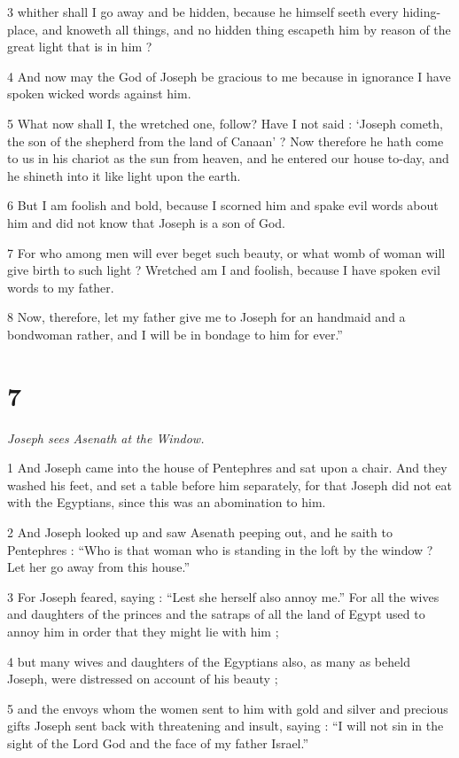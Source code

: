 3 whither shall I go away and be hidden, because he himself seeth every hiding-place, and knoweth all things, and no hidden thing escapeth him by reason of the great light that is in him ? 

4 And now may the God of Joseph be gracious to me because in ignorance I have spoken wicked words against him. 

5 What now shall I, the wretched one, follow? Have I not said : ‘Joseph cometh, the son of the shepherd from the land of Canaan’ ? Now therefore he hath come to us in his chariot as the sun from heaven, and he entered our house to-day, and he shineth into it like light upon the earth. 

6 But I am foolish and bold, because I scorned him and spake evil words about him and did not know that Joseph is a son of God. 

7 For who among men will ever beget such beauty, or what womb of woman will give birth to such light ? Wretched am I and foolish, because I have spoken evil words to my father. 

8 Now, therefore, let my father give me to Joseph for an handmaid and a bondwoman rather, and I will be in bondage to him for ever.”

\chapter{7}

\par \textit{Joseph sees Asenath at the Window.}

1 And Joseph came into the house of Pentephres and sat upon a chair. And they washed his feet, and set a table before him separately, for that Joseph did not eat with the Egyptians, since this was an abomination to him. 

2 And Joseph looked up and saw Asenath peeping out, and he saith to Pentephres : “Who is that woman who is standing in the loft by the window ? Let her go away from this house.” 

3 For Joseph feared, saying : “Lest she herself also annoy me.” For all the wives and daughters of the princes and the satraps of all the land of Egypt used to annoy him in order that they might lie with him ; 

4 but many wives and daughters of the Egyptians also, as many as beheld Joseph, were distressed on account of his beauty ; 

5 and the envoys whom the women sent to him with gold and silver and precious gifts Joseph sent back with threatening and insult, saying : “I will not sin in the sight of the Lord God and the face of my father Israel.” 


